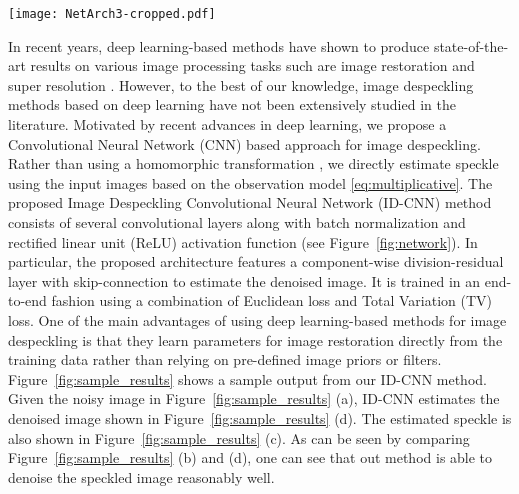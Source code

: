 \documentclass[journal]{IEEEtran}
\begin{document}
\begin{figure*}[t]
	\centering
	\texttt{[image: NetArch3-cropped.pdf]}
	\caption{Proposed  ID-CNN network architecture for image despeckling.}
	\label{fig:network}
\end{figure*}


In recent years, deep learning-based methods have shown to produce state-of-the-art results on various image processing tasks such are image restoration \cite{cnn, cnnderain} and super resolution \cite{cnnsuper}.    However, to the best of our knowledge, image despeckling methods based on deep learning have not been extensively studied in the literature.   Motivated by recent advances in deep learning, we propose a Convolutional Neural Network (CNN) based approach for image despeckling.  Rather than using a homomorphic transformation \cite{Despeckle_MCA}, we directly estimate speckle using the input images based on the observation model \eqref{eq:multiplicative}.  The proposed  Image Despeckling Convolutional Neural Network (ID-CNN) method consists of several convolutional layers along with batch normalization \cite{batch_normalization} and rectified linear unit (ReLU) \cite{imagenet} activation function (see Figure~\ref{fig:network}).  In particular, the proposed architecture features a component-wise division-residual layer with skip-connection to estimate the denoised image.   It is trained in an end-to-end fashion using a combination of Euclidean loss and Total Variation (TV) loss.  One of the main advantages of using deep learning-based methods for image despeckling is that they learn parameters for image restoration directly from the training data rather than relying on pre-defined image priors or filters.
Figure~\ref{fig:sample_results} shows a sample output from our ID-CNN method.  Given the noisy image in Figure~\ref{fig:sample_results} (a), ID-CNN estimates the denoised image shown in Figure~\ref{fig:sample_results} (d).  The estimated speckle is also shown in Figure~\ref{fig:sample_results} (c).  As can be seen by comparing Figure~\ref{fig:sample_results} (b) and (d), one can see that out method is able to denoise the speckled image reasonably well. 





%
\end{document}

